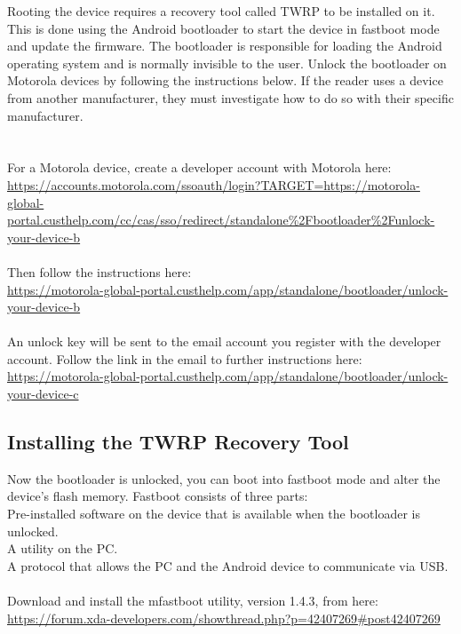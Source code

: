 Rooting the device requires a recovery tool called TWRP to be installed on it.  This is done using the Android bootloader to start the device in fastboot mode and update the firmware.  The bootloader is responsible for loading the Android operating system and is normally invisible to the user.  Unlock the bootloader on Motorola devices by following the instructions below.  If the reader uses a device from another manufacturer, they must investigate how to do so with their specific manufacturer.\\
\\
\\
For a Motorola device, create a developer account with Motorola here:\\
\url{https://accounts.motorola.com/ssoauth/login?TARGET=https://motorola-global-portal.custhelp.com/cc/cas/sso/redirect/standalone\%2Fbootloader\%2Funlock-your-device-b}\\
\\
Then follow the instructions here:\\
\url{https://motorola-global-portal.custhelp.com/app/standalone/bootloader/unlock-your-device-b}\\
\\
An unlock key will be sent to the email account you register with the developer account.  Follow the link in the email to further instructions here:\\
\url{https://motorola-global-portal.custhelp.com/app/standalone/bootloader/unlock-your-device-c}

\subsection{Installing the TWRP Recovery Tool}
\label{sec:Installing the recovery tool}

Now the bootloader is unlocked, you can boot into fastboot mode and alter the device's flash memory.  Fastboot consists of three parts:\\
Pre-installed software on the device that is available when the bootloader is unlocked.\\
A utility on the PC.\\
A protocol that allows the PC and the Android device to communicate via USB.\\
\\
Download and install the mfastboot utility, version 1.4.3, from here:\\
\url{https://forum.xda-developers.com/showthread.php?p=42407269#post42407269}\\

